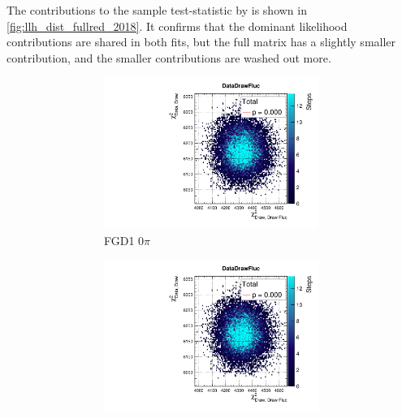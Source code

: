 The contributions to the sample test-statistic by \pmu \cosmu is shown in \autoref{fig:llh_dist_fullred_2018}. It confirms that the dominant likelihood contributions are shared in both fits, but the full matrix has a slightly smaller contribution, and the smaller contributions are washed out more.
\begin{figure}[h]
	\begin{subfigure}[t]{\textwidth}
	\begin{subfigure}[t]{0.32\textwidth}
		\includegraphics[width=\textwidth, trim={20mm 6mm 4mm 11mm}, clip,page=7]{figures/mach3/2018/data/2018a_FixedCov_RedCov_Mpi_Data_merge_PostPredStore_FullLLH_procs}
		\caption*{FGD1 0$\pi$}
	\end{subfigure}
\begin{subfigure}[t]{0.32\textwidth}
\includegraphics[width=\textwidth, trim={20mm 6mm 4mm 11mm}, clip,page=52]{figures/mach3/2018/data/2018a_FixedCov_RedCov_Mpi_Data_merge_PostPredStore_FullLLH_procs}

\end{subfigure}
\end{subfigure}
\end{figure}
